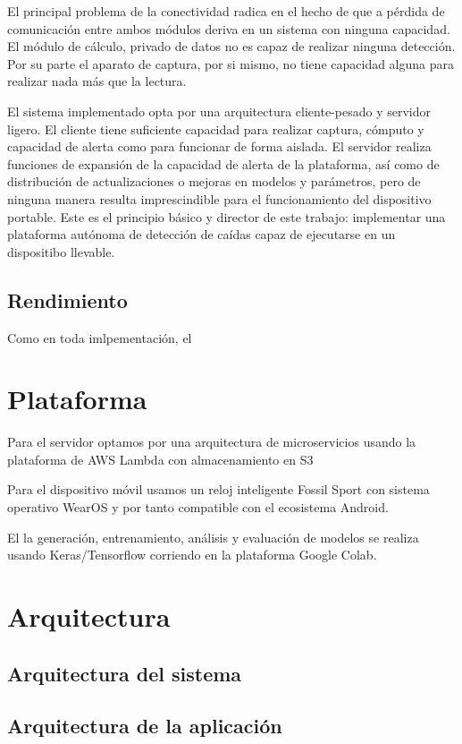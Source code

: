 \documentclass[../tfm.tex]{subfiles}
\begin{document}
El principal problema de la conectividad radica en el hecho de que a pérdida de comunicación entre ambos módulos deriva en un sistema con ninguna capacidad. El módulo de cálculo, privado de datos no es capaz de realizar ninguna detección. Por su parte el aparato de captura, por si mismo, no tiene capacidad alguna para realizar nada más que la lectura.

El sistema implementado opta por una arquitectura cliente-pesado y servidor ligero. El cliente tiene suficiente capacidad para realizar captura, cómputo y capacidad de alerta como para funcionar de forma aislada. El servidor realiza funciones de expansión de la capacidad de alerta de la plataforma, así como de distribución de actualizaciones o mejoras en modelos y parámetros, pero de ninguna manera resulta imprescindible para el funcionamiento del dispositivo portable. Este es el principio básico y director de este trabajo: implementar una plataforma autónoma de detección de caídas capaz de ejecutarse en un dispositibo llevable.

\subsection{Rendimiento}

Como en toda imlpementación, el

\section{Plataforma}

Para el servidor optamos por una arquitectura de microservicios usando la plataforma de AWS Lambda con almacenamiento en S3

Para el dispositivo móvil usamos un reloj inteligente Fossil Sport con sistema operativo WearOS y por tanto compatible con el ecosistema Android.

El la generación, entrenamiento, análisis y evaluación de modelos se realiza usando Keras/Tensorflow corriendo en la plataforma Google Colab.

\section{Arquitectura}

\subsection{Arquitectura del sistema}

\subsection{Arquitectura de la aplicación}
\end{document}
